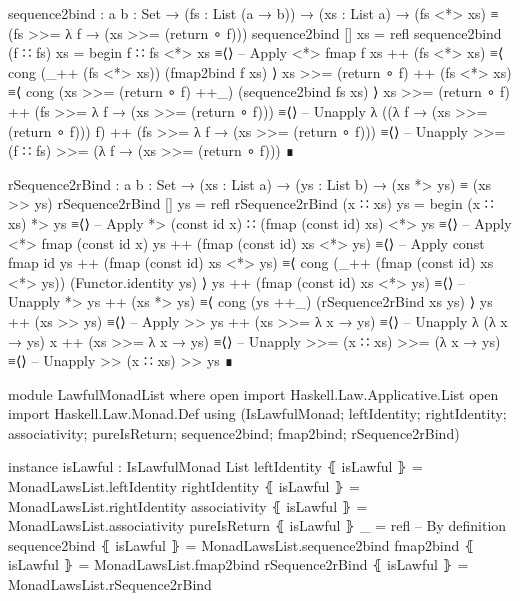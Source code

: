 \documentclass{article}
\begin{document}
\begin{code}
  sequence2bind : {a b : Set}
    → (fs : List (a → b)) → (xs : List a)
    → (fs <*> xs) ≡ (fs >>= λ f → (xs >>= (return ∘ f)))
  sequence2bind [] xs = refl
  sequence2bind (f ∷ fs) xs =
    begin
      f ∷ fs <*> xs
    ≡⟨⟩ -- Apply <*>
      fmap f xs ++ (fs <*> xs)
    ≡⟨ cong (_++ (fs <*> xs)) (fmap2bind f xs) ⟩
      xs >>= (return ∘ f) ++ (fs <*> xs)
    ≡⟨ cong (xs >>= (return ∘ f) ++_) (sequence2bind fs xs) ⟩
      xs >>= (return ∘ f)
        ++ (fs >>= λ f → (xs >>= (return ∘ f)))
    ≡⟨⟩ -- Unapply λ
      ((λ f → (xs >>= (return ∘ f))) f)
        ++ (fs >>= λ f → (xs >>= (return ∘ f)))
    ≡⟨⟩ -- Unapply >>=
      (f ∷ fs) >>= (λ f → (xs >>= (return ∘ f)))
    ∎
\end{code}
\begin{code}
  rSequence2rBind : {a b : Set} → (xs : List a) → (ys : List b)
    → (xs *> ys) ≡ (xs >> ys)
  rSequence2rBind [] ys = refl
  rSequence2rBind (x ∷ xs) ys =
    begin
      (x ∷ xs) *> ys
    ≡⟨⟩ -- Apply *>
      (const id x) ∷ (fmap (const id) xs) <*> ys
    ≡⟨⟩ -- Apply <*>
      fmap (const id x) ys ++ (fmap (const id) xs <*> ys)
    ≡⟨⟩ -- Apply const
      fmap id ys ++ (fmap (const id) xs <*> ys)
    ≡⟨ cong (_++ (fmap (const id) xs <*> ys)) (Functor.identity ys) ⟩
      ys ++ (fmap (const id) xs <*> ys)
    ≡⟨⟩ -- Unapply *>
      ys ++ (xs *> ys)
    ≡⟨ cong (ys ++_) (rSequence2rBind xs ys) ⟩
      ys ++ (xs >> ys)
    ≡⟨⟩ -- Apply >>
      ys ++ (xs >>= λ x → ys)
    ≡⟨⟩ -- Unapply λ
      (λ x → ys) x ++ (xs >>= λ x → ys)
    ≡⟨⟩ -- Unapply >>=
      (x ∷ xs) >>= (λ x → ys)
    ≡⟨⟩ -- Unapply >>
      (x ∷ xs) >> ys
    ∎
\end{code}
\begin{code}
module LawfulMonadList where
  open import Haskell.Law.Applicative.List
  open import Haskell.Law.Monad.Def
    using (IsLawfulMonad; leftIdentity; rightIdentity;
      associativity; pureIsReturn; sequence2bind; fmap2bind;
      rSequence2rBind)
\end{code}
\begin{code}
  instance
    isLawful : IsLawfulMonad List
    leftIdentity ⦃ isLawful ⦄ = MonadLawsList.leftIdentity
    rightIdentity ⦃ isLawful ⦄ = MonadLawsList.rightIdentity
    associativity ⦃ isLawful ⦄ = MonadLawsList.associativity
    pureIsReturn ⦃ isLawful ⦄ _ = refl -- By definition
    sequence2bind ⦃ isLawful ⦄ = MonadLawsList.sequence2bind
    fmap2bind ⦃ isLawful ⦄ = MonadLawsList.fmap2bind
    rSequence2rBind ⦃ isLawful ⦄ = MonadLawsList.rSequence2rBind
\end{code}
\end{document}
